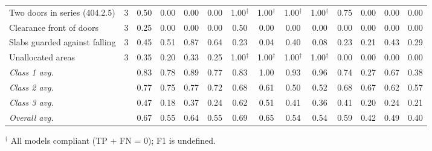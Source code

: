 \begin{table}[t]
\begin{tabular}{l c | cccc | cccc | cccc}
Two doors in series (404.2.5) & 3 & 0.50 & 0.00 & 0.00 & 0.00 & 1.00$^\dagger$ & 1.00$^\dagger$ & 1.00$^\dagger$ & 1.00$^\dagger$ & 0.75 & 0.00 & 0.00 & 0.00 \\
Clearance front of doors & 3 & 0.25 & 0.00 & 0.00 & 0.00 & 0.50 & 0.00 & 0.00 & 0.00 & 0.00 & 0.00 & 0.00 & 0.00 \\
Slabs guarded against falling & 3 & 0.45 & 0.51 & 0.87 & 0.64 & 0.23 & 0.04 & 0.40 & 0.08 & 0.23 & 0.21 & 0.43 & 0.29 \\
Unallocated areas & 3 & 0.35 & 0.20 & 0.33 & 0.25 & 1.00$^\dagger$ & 1.00$^\dagger$ & 1.00$^\dagger$ & 1.00$^\dagger$ & 0.00 & 0.00 & 0.00 & 0.00 \\
\midrule
\textit{Class 1 avg.} &  & 0.83 & 0.78 & 0.89 & 0.77 & 0.83 & 1.00 & 0.93 & 0.96 & 0.74 & 0.27 & 0.67 & 0.38 \\
\textit{Class 2 avg.} &  & 0.77 & 0.75 & 0.77 & 0.72 & 0.68 & 0.61 & 0.50 & 0.52 & 0.68 & 0.67 & 0.62 & 0.57 \\
\textit{Class 3 avg.} &  & 0.47 & 0.18 & 0.37 & 0.24 & 0.62 & 0.51 & 0.41 & 0.36 & 0.41 & 0.20 & 0.24 & 0.21 \\
\midrule
\textit{Overall avg.} &  & 0.67 & 0.55 & 0.64 & 0.55 & 0.69 & 0.65 & 0.54 & 0.54 & 0.59 & 0.42 & 0.49 & 0.40 \\
\bottomrule
\end{tabular}
\vspace{1mm}
\footnotesize{$^\dagger$ All models compliant (TP + FN = 0); F1 is undefined.}
\end{table}